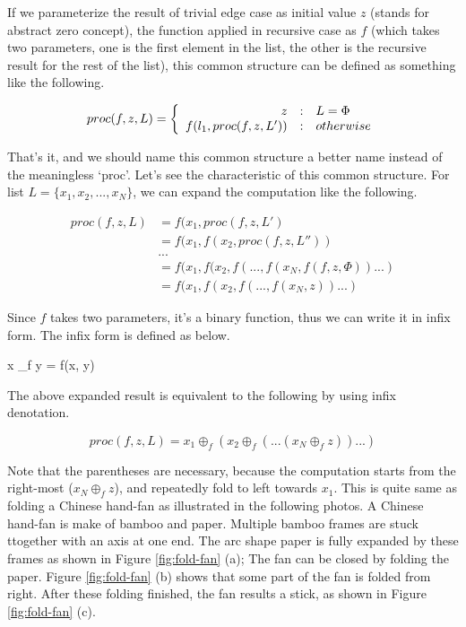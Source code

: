 \documentclass{article}
\begin{document}
If we parameterize the result of trivial edge case as initial value $z$ (stands for abstract zero concept), the
function applied in recursive case as $f$ (which takes two parameters, one is the first element in the list, 
the other is the recursive result for the rest of the list), this common structure can be defined as something
like the following.

\[
proc(f, z, L) = \left \{
  \begin{array}
  {r@{\quad:\quad}l}
  z & L = \Phi \\
  f(l_1, proc(f, z, L')) & otherwise
  \end{array}
\right.
\]

That's it, and we should name this common structure a better name instead of the meaningless `proc'. Let's
see the characteristic of this common structure. For list $L = \{x_1, x_2, ..., x_N \}$, we can expand the 
computation like the following.

\[
\begin{array}{rl}
proc(f, z, L) & = f(x_1, proc(f, z, L') \\
        & = f(x_1, f(x_2, proc(f, z, L'')) \\
        & ... \\
        & = f(x_1, f(x_2, f(..., f(x_N, f(f, z, \Phi))...) \\
        & = f(x_1, f(x_2, f(..., f(x_N, z))...)
\end{array}
\]

Since $f$ takes two parameters, it's a binary function, thus we can write it in infix form. The infix
form is defined as below.

\be
x \oplus_f y = f(x, y)
\ee

The above expanded result is equivalent to the following by using infix denotation.

\[
proc(f, z, L) = x_1 \oplus_f (x_2 \oplus_f (... (x_N \oplus_f z))...)
\]

Note that the parentheses are necessary, because the computation starts from the right-most ($x_N \oplus_f z$),
and repeatedly fold to left towards $x_1$. This is quite same as folding a Chinese hand-fan as illustrated
in the following photos. A Chinese hand-fan is make of bamboo and paper. Multiple bamboo frames are stuck
ttogether with an axis at one end. The arc shape paper is fully expanded by these frames as shown in Figure 
\ref{fig:fold-fan} (a);
The fan can be closed by folding the paper. Figure \ref{fig:fold-fan} (b) shows that some part of the fan
is folded from right. After these folding finished, the fan results a stick, as shown in Figure \ref{fig:fold-fan} (c).
\end{document}
